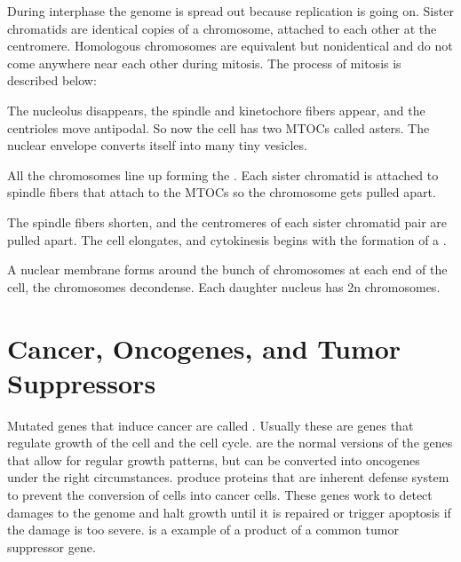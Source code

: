 \documentclass[../Bio_chemistryReview.tex]{subfiles}
\begin{document}
During interphase the genome is spread out because replication is going on.
Sister chromatids are identical copies of a chromosome, attached to each other
at the centromere. Homologous chromosomes are equivalent but nonidentical and do
not come anywhere near each other during mitosis. The process of mitosis is
described below:
\begin{description}
    \item {} The nucleolus disappears, the spindle and
        kinetochore fibers appear, and the centrioles move antipodal. So now the
        cell has two MTOCs called asters. The nuclear envelope converts itself
        into many tiny vesicles.
    \item {} All the chromosomes line up forming the
        . Each sister chromatid is attached
        to spindle fibers that attach to the MTOCs so the chromosome gets pulled
        apart.
    \item {} The spindle fibers shorten, and the
        centromeres of each sister chromatid pair are pulled apart. The cell
        elongates, and cytokinesis begins with the formation of a
        .
    \item {} A nuclear membrane forms around the bunch
        of chromosomes at each end of the cell, the chromosomes decondense. Each
        daughter nucleus has 2n chromosomes.
\end{description}

\section{Cancer, Oncogenes, and Tumor Suppressors}
Mutated genes that induce cancer are called . Usually these
are genes that regulate growth of the cell and the cell cycle.
 are the normal versions of the genes that allow for
regular growth patterns, but can be converted into oncogenes under the right
circumstances.  produce proteins that are
inherent defense system to prevent the conversion of cells into cancer cells.
These genes work to detect damages to the genome and halt growth until it is
repaired or trigger apoptosis if the damage is too severe.  is a example of a product of a common tumor suppressor
gene.
\end{document}
